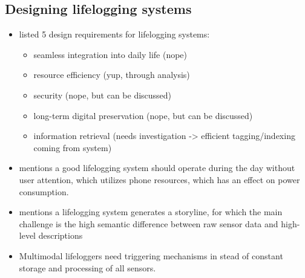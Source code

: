 \subsection{Designing lifelogging systems}
\begin{itemize}
	\item \citet{rawassizadeh2013ubiqlog} listed 5 design requirements for lifelogging systems:
	\begin{itemize}
		\item seamless integration into daily life (nope)
		\item resource efficiency (yup, through analysis)
		\item security (nope, but can be discussed)
		\item long-term digital preservation (nope, but can be discussed)
		\item information retrieval (needs investigation -> efficient tagging/indexing coming from system)
	\end{itemize}
	\item \cite{bayindir2017survey} mentions a good lifelogging system should operate during the day without user attention, which utilizes phone resources, which has an effect on power consumption.
	\item \cite{bayindir2017survey} mentions a lifelogging system generates a storyline, for which the main challenge is the high semantic difference between raw sensor data and high-level descriptions
	\item \cite{jiang2019memento} Multimodal lifeloggers need triggering mechanisms in stead of constant storage and processing of all sensors.
\end{itemize}

